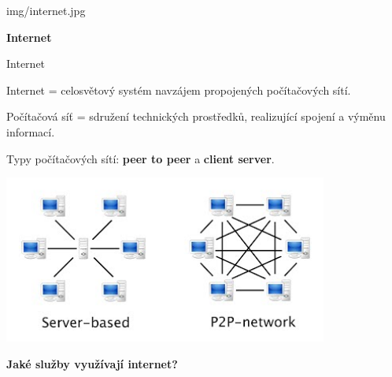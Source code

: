 \documentclass[aspectratio=1610]{beamer}
\begin{document}
\begin{frameImg}[width]{img/internet.jpg}
    \vspace*{60mm}
    \begin{cardTiny}
        \vspace*{\fill}
        \begin{center}
            \textbf{Internet}
        \end{center}
    \end{cardTiny}
\end{frameImg}

\begin{frame}{Internet}
    \begin{cardTiny}
        \begin{flushleft}
            Internet = celosvětový systém navzájem propojených počítačových sítí.

            
            \vspace{2ex}
            Počítačová síť = sdružení technických prostředků, realizující spojení a výměnu informací.

            
            \vspace{2ex}
            Typy počítačových sítí: \textbf{peer to peer} a \textbf{client server}.
        \end{flushleft}
    \end{cardTiny}
\end{frame}


\begin{frame}
    \begin{center}    
        \includegraphics[width=0.8\textwidth]{img/p2pcs.jpg}
    \end{center}

    \begin{cardTiny}
        \begin{center}
            \textbf{Jaké služby využívají internet?}
        \end{center}
    \end{cardTiny}
\end{frame}
\end{document}
